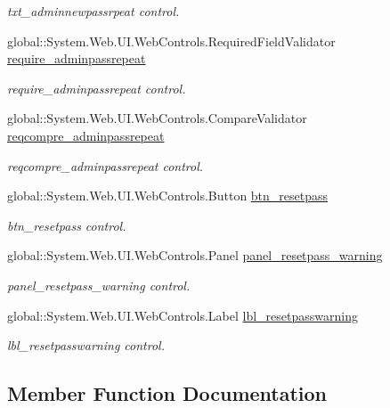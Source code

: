\begin{DoxyCompactItemize}
\begin{DoxyCompactList}\small\item\em txt\+\_\+adminnewpassrpeat control. \end{DoxyCompactList}\item 
global\+::\+System.\+Web.\+U\+I.\+Web\+Controls.\+Required\+Field\+Validator \mbox{\hyperlink{class_admin__resetpass_a5d4dd195dd469a636018fb81350d9745}{require\+\_\+adminpassrepeat}}
\begin{DoxyCompactList}\small\item\em require\+\_\+adminpassrepeat control. \end{DoxyCompactList}\item 
global\+::\+System.\+Web.\+U\+I.\+Web\+Controls.\+Compare\+Validator \mbox{\hyperlink{class_admin__resetpass_ad7b031311d4b32843f8d22db4805b274}{reqcompre\+\_\+adminpassrepeat}}
\begin{DoxyCompactList}\small\item\em reqcompre\+\_\+adminpassrepeat control. \end{DoxyCompactList}\item 
global\+::\+System.\+Web.\+U\+I.\+Web\+Controls.\+Button \mbox{\hyperlink{class_admin__resetpass_acc15dd3ae76be095cdb1b341aa0b2116}{btn\+\_\+resetpass}}
\begin{DoxyCompactList}\small\item\em btn\+\_\+resetpass control. \end{DoxyCompactList}\item 
global\+::\+System.\+Web.\+U\+I.\+Web\+Controls.\+Panel \mbox{\hyperlink{class_admin__resetpass_acb62fa4ed3feaff8b6badd4a9c7bf474}{panel\+\_\+resetpass\+\_\+warning}}
\begin{DoxyCompactList}\small\item\em panel\+\_\+resetpass\+\_\+warning control. \end{DoxyCompactList}\item 
global\+::\+System.\+Web.\+U\+I.\+Web\+Controls.\+Label \mbox{\hyperlink{class_admin__resetpass_aaa804b549e7272b5a4f219450dc25285}{lbl\+\_\+resetpasswarning}}
\begin{DoxyCompactList}\small\item\em lbl\+\_\+resetpasswarning control. \end{DoxyCompactList}\end{DoxyCompactItemize}


\subsection{Member Function Documentation}
\mbox{\label{class_admin__resetpass_a51aa47a260bd5a18be891dbb13763ac8}} 
